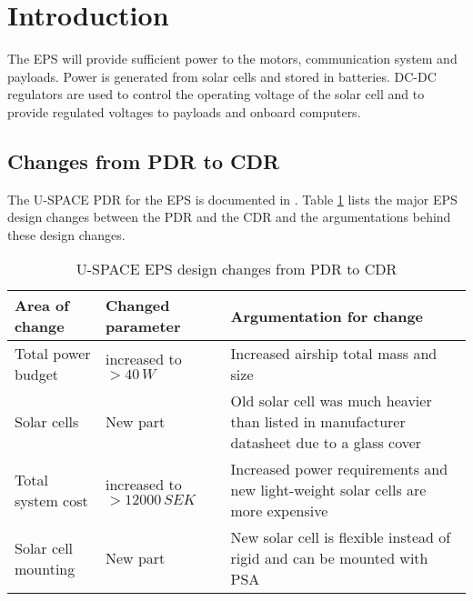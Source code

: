 \newpage
\section{Introduction}
\label{sec:introduction}

The \ac{EPS} will provide sufficient power to the motors, communication system and payloads. Power is generated from solar cells and stored in batteries. DC-DC regulators are used to control the operating voltage of the solar cell and to provide regulated voltages to payloads and onboard computers.
%
\subsection{Changes from PDR to CDR}
\label{sec:changes_pdr_to_cdr}
%
The U-SPACE \ac{PDR} for the \ac{EPS} is documented in \cite{PDR}. Table \ref{tab:pdr_to_cdr} lists the major \ac{EPS} design changes between the \ac{PDR} and the \ac{CDR} and the argumentations behind these design changes.

\begin{table}[H]
\centering
\caption{U-SPACE \ac{EPS} design changes from PDR to CDR}
\label{tab:pdr_to_cdr}
\begin{tabular}{p{}p{}p{}}
\hline
\textbf{Area of change }& \textbf{Changed parameter }& \textbf{Argumentation for change}\\
\hline
Total power budget & increased to $>40\,W$ & Increased airship total mass and size\\
Solar cells & New part & Old solar cell was much heavier than listed in manufacturer datasheet due to a glass cover\\
Total system cost & increased to $>12000\,SEK$ & Increased power requirements and new light-weight solar cells are more expensive\\
Solar cell mounting & New part & New solar cell is flexible instead of rigid and can be mounted with \ac{PSA}\\
\hline
\end{tabular}
\end{table} 
